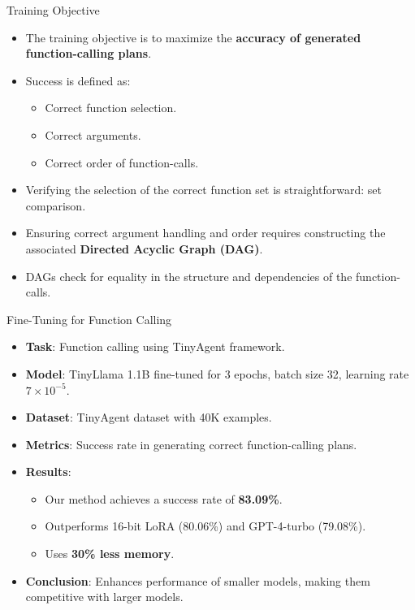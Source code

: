 \documentclass{beamer}
\begin{document}
\begin{frame}{Training Objective}
    \begin{itemize}
        \item The training objective is to maximize the \textbf{accuracy of generated function-calling plans}.
        \item Success is defined as:
        \begin{itemize}
            \item Correct function selection.
            \item Correct arguments.
            \item Correct order of function-calls.
        \end{itemize}
        \item Verifying the selection of the correct function set is straightforward: set comparison.
        \item Ensuring correct argument handling and order requires constructing the associated \textbf{Directed Acyclic Graph (DAG)}.
        \item DAGs check for equality in the structure and dependencies of the function-calls.
    \end{itemize}
\end{frame}

\begin{frame}{Fine-Tuning for Function Calling}
    \begin{itemize}
        \item \textbf{Task}: Function calling using TinyAgent framework.
        \item \textbf{Model}: TinyLlama 1.1B fine-tuned for 3 epochs, batch size 32, learning rate \(7 \times 10^{-5}\).
        \item \textbf{Dataset}: TinyAgent dataset with 40K examples.
        \item \textbf{Metrics}: Success rate in generating correct function-calling plans.
        \item \textbf{Results}:
            \begin{itemize}
                \item Our method achieves a success rate of \textbf{83.09\%}.
                \item Outperforms 16-bit LoRA (80.06\%) and GPT-4-turbo (79.08\%).
                \item Uses \textbf{30\% less memory}.
            \end{itemize}
        \item \textbf{Conclusion}: Enhances performance of smaller models, making them competitive with larger models.
    \end{itemize}
\end{frame}
\end{document}
